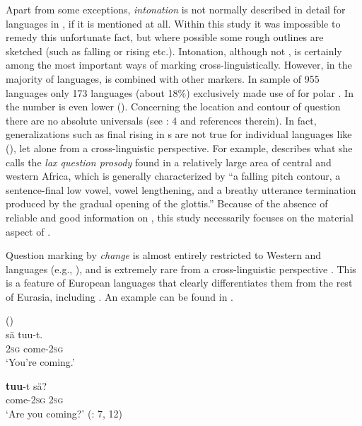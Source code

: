 Apart from some exceptions, \textit{intonation} is not normally described in detail for languages in , if it is mentioned at all. Within this study it was impossible to remedy this unfortunate fact, but where possible some rough outlines are sketched (such as falling or rising  etc.). Intonation, although not , is certainly among the most important ways of marking  cross-linguistically. However, in the majority of languages,  is combined with other markers. In  sample of 955 languages only 173 languages (about 18\%) exclusively made use of  for polar . In  the number is even lower (). Concerning the location and contour of question  there are no absolute universals (see \citealt{Sicoli2014}: 4 and references therein). In fact, generalizations such as final rising  in s are not true for individual languages like  (\citealt{Couper-Kuhlen2012}), let alone from a cross-linguistic perspective. For example, \citet[928]{Rialland2009} describes what she calls the \textit{lax question prosody} found in a relatively large area of central and western Africa, which is generally characterized by “a falling pitch contour, a sentence-final low vowel, vowel lengthening, and a breathy utterance termination produced by the gradual opening of the glottis.” Because of the absence of reliable and good information on , this study necessarily focuses on the material aspect of .

Question marking by \textit{ change} is almost entirely restricted to Western  and  languages (e.g., \citealt{Hackstein2013}), and is extremely rare from a cross-linguistic perspective \citep{Dryer2013m}. This is a feature of European languages that clearly differentiates them from the rest of Eurasia, including . An example can be found in  .

\ea%
    \label{ex:4:11}
     ()\\
    \ea
    \gll sä {tuu-}{t.}\\
    2\textsc{sg}    come-2\textsc{sg}\\
    \glt ‘You’re coming.’

    \ex
    \gll \textbf{{tuu}}{-}{t} sä?\\
    come-2\textsc{sg}  2\textsc{sg}\\
    \glt ‘Are you coming?’ (\citealt{Miestamo2011}: 7, 12)
    \z
    \z


